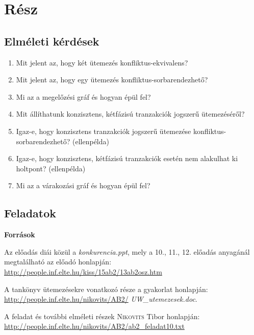 \documentclass[a4paper,11.5pt, table]{article}
\begin{document}
\newpage

\section{Rész}

\subsection{Elméleti kérdések}

	\begin{enumerate}
		\item Mit jelent az, hogy két ütemezés konfliktus-ekvivalens?
		
		\item Mit jelent az, hogy egy ütemezés konfliktus-sorbarendezhető?
		
		\item Mi az a megelőzési gráf és hogyan épül fel?
		
		\item Mit állíthatunk konzisztens, kétfázisú tranzakciók jogszerű ütemezéséről?
		
		\item Igaz-e, hogy konzisztens tranzakciók jogszerű ütemezése konfliktus-sorbarendezhető? (ellenpélda)
		
		\item Igaz-e, hogy konzisztens, kétfázisú tranzakciók esetén nem alakulhat ki holtpont? (ellenpélda)
		
		\item Mi az a várakozási gráf és hogyan épül fel?
	\end{enumerate}

\subsection{Feladatok}

	{\large \textbf{Források}}
	\begin{compactitem}
		\item Az előadás diái közül a \textit{konkurencia.ppt}, mely a 10., 11., 12. előadás anyagánál megtalálható az előadó honlapján: \url{http://people.inf.elte.hu/kiss/15ab2/13ab2osz.htm}
		 \item A tankönyv ütemezésekre vonatkozó része a gyakorlat honlapján: \url{http://people.inf.elte.hu/nikovits/AB2/} \textit{UW\_utemezesek.doc}.
		\item A feladat és további elméleti részek \textsc{Nikovits} Tibor honlapján: \url{http://people.inf.elte.hu/nikovits/AB2/ab2_feladat10.txt}
	\end{compactitem}
\end{document}
